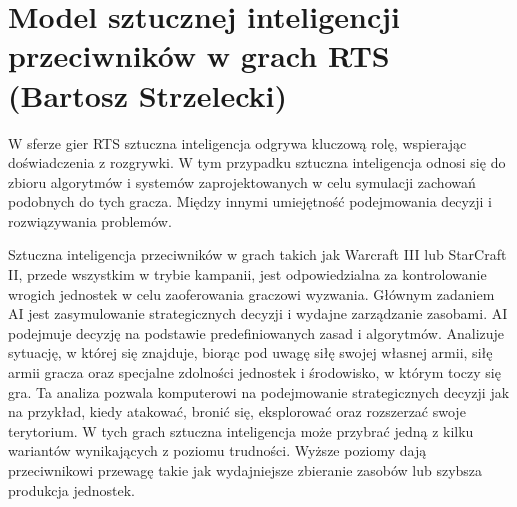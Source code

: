 \section{Model sztucznej inteligencji przeciwników w grach RTS (Bartosz Strzelecki)}
W sferze gier RTS sztuczna inteligencja odgrywa kluczową rolę, wspierając doświadczenia z rozgrywki.
W tym przypadku sztuczna inteligencja odnosi się do zbioru algorytmów i systemów zaprojektowanych w celu symulacji
zachowań podobnych do tych gracza. Między innymi umiejętność podejmowania decyzji i rozwiązywania problemów.

Sztuczna inteligencja przeciwników w grach takich jak Warcraft III lub StarCraft II, przede wszystkim w trybie kampanii,
jest odpowiedzialna za kontrolowanie wrogich jednostek w celu zaoferowania graczowi wyzwania. Głównym zadaniem AI jest zasymulowanie
strategicznych decyzji i wydajne zarządzanie zasobami.
AI podejmuje decyzję na podstawie predefiniowanych zasad i algorytmów. Analizuje sytuację, w której się znajduje, biorąc pod uwagę
siłę swojej własnej armii, siłę armii gracza oraz specjalne zdolności jednostek i środowisko, w którym toczy się gra.
Ta analiza pozwala komputerowi na podejmowanie strategicznych decyzji jak na przykład, kiedy atakować, bronić się, eksplorować oraz rozszerzać swoje terytorium.
W tych grach sztuczna inteligencja może przybrać jedną z kilku wariantów wynikających z poziomu trudności. Wyższe poziomy
dają przeciwnikowi przewagę takie jak wydajniejsze zbieranie zasobów lub szybsza produkcja jednostek.

